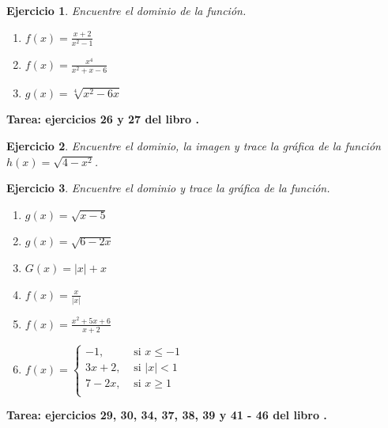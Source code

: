 \documentclass[12pt,tikz,border=5pt]{article}
\newtheorem{ejercicio}{Ejercicio}[section]
\begin{document}
\newpage
\begin{ejercicio}
  Encuentre el dominio de la función.
  \begin{enumerate}[label=(\alph*)]
    \item $f(x) = \displaystyle\frac{x+2}{x^{2} - 1}$
    \item $f(x) = \displaystyle\frac{x^4}{x^2+x-6}$
    \item $g(x) = \sqrt[4]{x^2 - 6x}$
  \end{enumerate}
\end{ejercicio}

\textbf{Tarea: ejercicios 26 y 27 del libro \citep{stewart2001calculo}.}

\begin{ejercicio}
  Encuentre el dominio, la imagen y trace la gráfica de la función $h(x) = \sqrt{4 - x^2}$.
\end{ejercicio}

\begin{ejercicio}
  Encuentre el dominio y trace la gráfica de la función.
  \begin{enumerate}[label=(\alph*)]
    \item $g(x) = \sqrt{x - 5}$
    \item $g(x) = \sqrt{6 - 2x}$
    \item $G(x) = |x| + x$
    \item $f(x) = \displaystyle\frac{x}{|x|}$
    \item $f(x) = \displaystyle\frac{x^2 + 5x + 6}{x + 2}$
    \item $f(x) = 
      \begin{cases}
        -1, &\text{ si } x \leq -1\\
        3x + 2, &\text{ si } |x| < 1\\
        7 - 2x, &\text{ si } x \geq 1\\
      \end{cases}$
  \end{enumerate}
\end{ejercicio}

\textbf{Tarea: ejercicios 29, 30, 34, 37, 38, 39 y 41 - 46 del libro \citep{stewart2001calculo}.}
\end{document}
